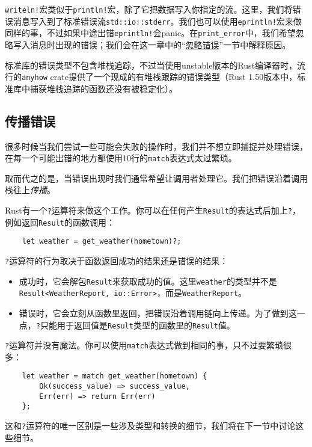 \texttt{writeln!}宏类似于\texttt{println!}宏，除了它把数据写入你指定的流。这里，我们将错误消息写入到了标准错误流\texttt{std::io::stderr}。我们也可以使用\texttt{eprintln!}宏来做同样的事，不过如果中途出错\texttt{eprintln!}会panic。在\texttt{print\_error}中，我们希望忽略写入消息时出现的错误；我们会在这一章中的“\hyperref[ignoreerr]{忽略错误}”一节中解释原因。

标准库的错误类型不包含堆栈追踪，不过当使用unstable版本的Rust编译器时，流行的\texttt{anyhow} crate提供了一个现成的有堆栈跟踪的错误类型（Rust 1.50版本中，标准库中捕获堆栈追踪的函数还没有被稳定化）。

\subsection{传播错误}\label{properror}
很多时候当我们尝试一些可能会失败的操作时，我们并不想立即捕捉并处理错误，在每一个可能出错的地方都使用10行的\texttt{match}表达式太过繁琐。

取而代之的是，当错误出现时我们通常希望让调用者处理它。我们把错误沿着调用栈往上\emph{传播}。

Rust有一个\texttt{?}运算符来做这个工作。你可以在任何产生\texttt{Result}的表达式后加上\texttt{?}，例如返回\texttt{Result}的函数调用：
\begin{verbatim}
    let weather = get_weather(hometown)?;
\end{verbatim}

\texttt{?}运算符的行为取决于函数返回成功的结果还是错误的结果：
\begin{itemize}
    \item 成功时，它会解包\texttt{Result}来获取成功的值。这里\texttt{weather}的类型并不是\\
    \texttt{Result<WeatherReport, io::Error>}，而是\texttt{WeatherReport}。
    \item 错误时，它会立刻从函数里返回，把错误沿着调用链向上传递。为了做到这一点，\texttt{?}只能用于返回值是\texttt{Result}类型的函数里的\texttt{Result}值。
\end{itemize}

\texttt{?}运算符并没有魔法。你可以使用\texttt{match}表达式做到相同的事，只不过要繁琐很多：
\begin{verbatim}
    let weather = match get_weather(hometown) {
        Ok(success_value) => success_value,
        Err(err) => return Err(err)
    };
\end{verbatim}

这和\texttt{?}运算符的唯一区别是一些涉及类型和转换的细节，我们将在下一节中讨论这些细节。

